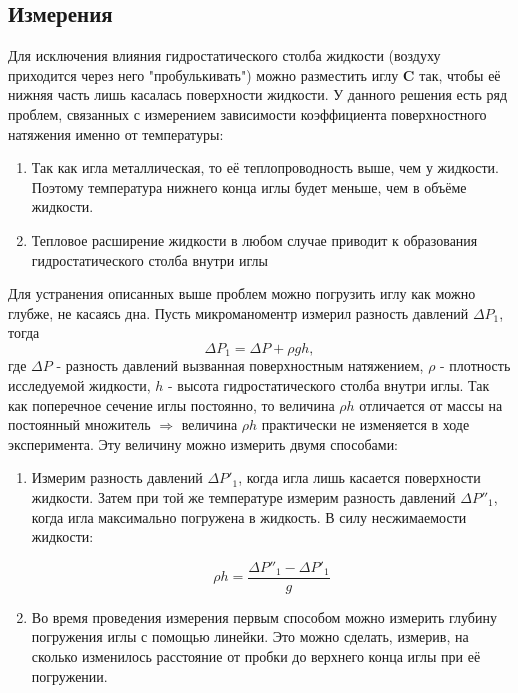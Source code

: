\documentclass[15pt,a5paper,reqno]{article}
\begin{document}
    \subsection{Измерения}
    
    Для исключения влияния гидростатического столба жидкости (воздуху приходится через него "пробулькивать") можно разместить иглу \textbf{C} так, чтобы её нижняя часть лишь касалась поверхности жидкости. У данного решения есть ряд проблем, связанных с измерением зависимости коэффициента поверхностного натяжения именно от температуры:
    \begin{enumerate}
        \item Так как игла металлическая, то её теплопроводность выше, чем у жидкости. Поэтому температура нижнего конца иглы будет меньше, чем в объёме жидкости.
        \item Тепловое расширение жидкости в любом случае приводит к образования гидростатического столба внутри иглы
    \end{enumerate}
    
    Для устранения описанных выше проблем можно погрузить иглу как можно глубже, не касаясь дна. Пусть микроманоментр измерил разность давлений $\Delta P_1$, тогда 
    \begin{equation}\label{press}
        \Delta P_1 = \Delta P + \rho gh,
    \end{equation}
    где $\Delta P$ - разность давлений вызванная поверхностным натяжением, $\rho$ - плотность исследуемой жидкости, $h$ - высота гидростатического столба внутри иглы. Так как поперечное сечение иглы постоянно, то величина $\rho h$ отличается от массы на постоянный множитель $\Rightarrow$ величина $\rho h$ практически не изменяется в ходе эксперимента. Эту величину можно измерить двумя способами:
    \begin{enumerate}
        \item Измерим разность давлений $\Delta P'_1$, когда игла лишь касается поверхности жидкости. Затем при той же температуре измерим разность давлений $\Delta P''_1$, когда игла максимально погружена в жидкость. В силу несжимаемости жидкости: 
        
        \begin{equation}\label{rhoh}
            \rho h = \frac{\Delta P''_1 - \Delta P'_1}{g}
        \end{equation}
        \item Во время проведения измерения первым способом можно измерить глубину погружения иглы с помощью линейки. Это можно сделать, измерив, на сколько изменилось расстояние от пробки до верхнего конца иглы при её погружении.
    \end{enumerate}
    
\end{document}
